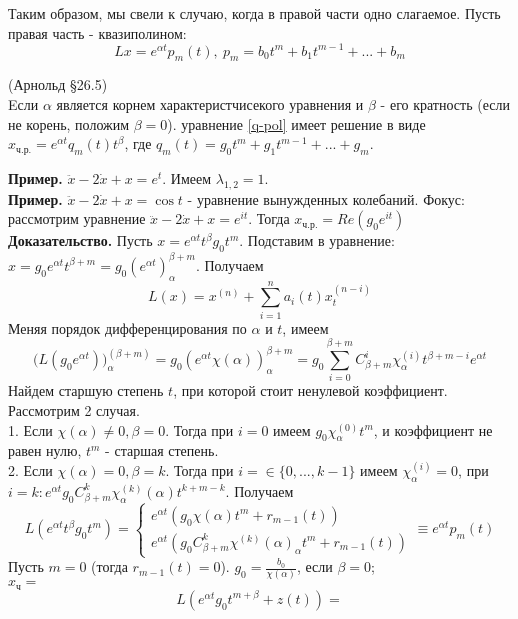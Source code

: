 Таким образом, мы свели к случаю, когда в правой части одно слагаемое. 
Пусть правая часть - квазиполином:
\begin{equation}\label{q-pol}
    Lx = e^{\alpha t}p_m(t),~p_m = b_0t^m + b_1t^{m-1} + ... +b_m
\end{equation}
\begin{theor}  (Арнольд \S 26.5)\\
    Eсли $\alpha$ является корнем характеристчисекого уравнения и $\beta$ - 
его кратность (если не корень, положим  $\beta = 0$).  уравнение
\ref{q-pol} имеет решение в виде  $x_\text{ч.р.} = e^{\alpha t}q_m(t)t^\beta$,
где $q_m(t)=g_0t^m + g_1t^{m-1}+...+g_m$.
\end{theor}
\textbf{Пример.} $\ddot x - 2\dot x + x = e^t$. Имеем  $\lambda_{1,2}=1$.\\
\textbf{Пример.} $\ddot x - 2\dot x + x =\cos t$ - уравнение 
вынужденных колебаний. Фокус: рассмотрим уравнение
$\ddot x - 2\dot x + x = e^{it}$. Тогда  $x_\text{ч.р.}=Re(g_0e^{it})$\\
\textbf{Доказательство.}  Пусть $x = e^{\alpha t}t^\beta g_0 t^m$. 
Подставим в уравнение: $x = g_0e^{\alpha t}t^{\beta +m} = g_0(e^{\alpha t})^{
    \beta +m}_\alpha$. 
Получаем
$$L(x) = x^{(n)} + \sum\limits_{i=1}^{n} a_i(t)x^{(n-i)}_t$$ 
Меняя порядок дифференцирования по $\alpha$ и $t$, имеем
$$\bigg(L(g_0e^{\alpha t})\bigg)^{(\beta +m)}_\alpha = 
g_0(e^{\alpha t}\chi(\alpha))^{\beta + m}_\alpha = 
g_0 \sum\limits_{i=0}^{\beta + m} C^i_{\beta + m}\chi^{(i)}_\alpha
t^{\beta + m -i}e^{\alpha t}
$$
Найдем старшую степень $t$, при которой стоит ненулевой коэффициент.
Рассмотрим 2 случая.\\
1. 
Если $\chi(\alpha)\ne 0,\beta = 0$. Тогда
при $i=0$ имеем  $g_0\chi^{(0)}_\alpha t^m$, и коэффициент не равен
нулю, $t^m$ - старшая степень. \\
2. Если $\chi(\alpha) = 0,\beta = k$. Тогда
при $i=\in \{0,...,k-1\}$ имеем $\chi^{(i)}_\alpha = 0$, при 
$i = k:e^{\alpha t}g_0 C^k_{\beta + m}\chi^{(k)}_\alpha(\alpha)t^{k+m-k}$. 
Получаем
$$L(e^{\alpha t}t^\beta g_0 t^m) = \begin{cases}
    e^{\alpha t}(g_0\chi(\alpha)t^m + r_{m-1}(t)) \\
    e^{\alpha t}(g_0C^k_{\beta + m}\chi^{(k)}(\alpha)_\alpha t^m + r_{m-1}(t))
\end{cases} \equiv e^{\alpha t}p_m(t)$$
Пусть $m = 0$ (тогда $r_{m-1}(t) = 0$). 
$g_0 = \frac{b_0}{\chi(\alpha)}$, если $\beta = 0$;\\
$x_\text{ч} = $
$$L(e^{\alpha t}g_0 t^{m+\beta} + z(t)) = $$


